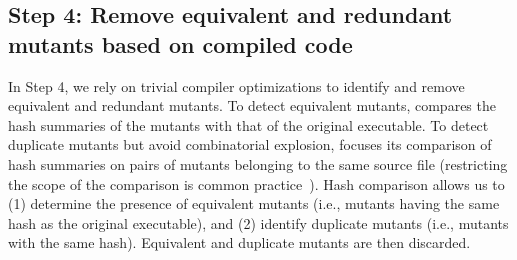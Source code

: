  

\subsection{Step 4: Remove equivalent and redundant mutants based on compiled code}

In Step 4, we rely on trivial compiler optimizations to identify and remove equivalent and redundant mutants. 
To detect equivalent mutants, \APPR compares the hash summaries of the mutants with that of the original executable. To detect duplicate mutants but avoid combinatorial explosion, \APPR focuses its comparison of hash summaries on pairs of mutants belonging to the same source file (restricting the scope of the comparison is common practice~\cite{kintis2017detecting}).
Hash comparison allows us to (1) determine the presence of equivalent mutants (i.e., mutants having the same hash as the original executable), and (2) identify duplicate mutants (i.e., mutants with the same hash). %
Equivalent and duplicate mutants are then discarded. 

